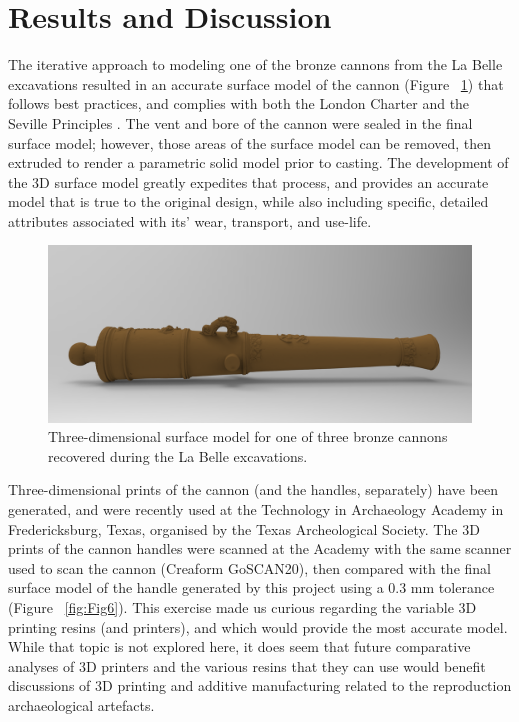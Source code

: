 \documentclass[review]{elsarticle}
\begin{document}
\section*{Results and Discussion}

The iterative approach to modeling one of the bronze cannons from the La Belle excavations resulted in an accurate surface model of the cannon (Figure ~\ref{fig:Fig5}) that follows best practices, and complies with both the London Charter \citep{RN5872} and the Seville Principles \citep{RN5873}. The vent and bore of the cannon were sealed in the final surface model; however, those areas of the surface model can be removed, then extruded to render a parametric solid model prior to casting. The development of the 3D surface model greatly expedites that process, and provides an accurate model that is true to the original design, while also including specific, detailed attributes associated with its' wear, transport, and use-life.

\begin{figure}[ht]\centering
\includegraphics[width=\linewidth]{FigSurfaceModel}
\caption{Three-dimensional surface model for one of three bronze cannons recovered during the La Belle excavations.}
\label{fig:Fig5}
\end{figure}

Three-dimensional prints of the cannon (and the handles, separately) have been generated, and were recently used at the Technology in Archaeology Academy in Fredericksburg, Texas, organised by the Texas Archeological Society. The 3D prints of the cannon handles were scanned at the Academy with the same scanner used to scan the cannon (Creaform GoSCAN20), then compared with the final surface model of the handle generated by this project using a 0.3 mm tolerance (Figure ~\ref{fig:Fig6}). This exercise made us curious regarding the variable 3D printing resins (and printers), and which would provide the most accurate model. While that topic is not explored here, it does seem that future comparative analyses of 3D printers and the various resins that they can use would benefit discussions of 3D printing and additive manufacturing related to the reproduction archaeological artefacts.
\end{document}
